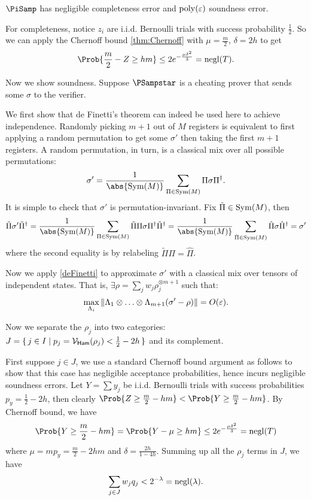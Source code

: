 \begin{thm}
    \label{QPIP1thm}
	$\PiSamp$ has negligible completeness error and $\operatorname*{\operatorname{poly}}(\varepsilon)$ soundness error.
\end{thm}
\begin{prf}
	For completeness, notice $z_i$ are i.i.d. Bernoulli trials with success probability $\frac{1}{2}$.
	So we can apply the Chernoff bound \cref{thm:Chernoff} with $\mu=\frac{m}{2}$, $\delta=2h$ to get
	$$\Prob{\frac{m}{2}-Z\geq hm}\leq2e^{-\frac{\mu\delta^2}{3}}=\negl(T).$$

	Now we show soundness.
	Suppose $\PSampstar$ is a cheating prover that sends some $\sigma$ to the verifier.

	We first show that de Finetti's theorem can indeed be used here to achieve independence.
	Randomly picking $m+1$ out of $M$ registers is equivalent to first applying a random permutation to get some $\sigma'$ then taking the first $m+1$ registers.
	A random permutation, in turn, is a classical mix over all possible permutations:
	$$\sigma'=\frac{1}{\abs{\Sym(M)}}\sum_{\Pi\in\Sym(M)}\Pi\sigma\Pi^\dagger.$$
	It is simple to check that $\sigma'$ is permutation-invariant.
	Fix $\tilde{\Pi}\in\operatorname{Sym}(M)$, then
	$$\tilde{\Pi}\sigma'\tilde{\Pi}^\dagger
	=\frac{1}{\abs{\Sym(M)}}\sum_{\Pi\in\Sym(M)}\tilde{\Pi}\Pi\sigma\Pi^\dagger\tilde{\Pi}^\dagger
	=\frac{1}{\abs{\Sym(M)}}\sum_{\hat{\Pi}\in\Sym(M)}\hat{\Pi}\sigma\hat{\Pi}^\dagger
	=\sigma'$$
	where the second equality is by relabeling $\tilde{\Pi}\Pi=\hat{\Pi}$.

	Now we apply \cref{deFinetti} to approximate $\sigma'$ with a classical mix over tensors of independent states.
	That is, $\exists\rho=\sum_j w_j\rho_j^{\otimes m+1}$ such that:
	$$\max_{\Lambda_i}\left\lVert\Lambda_1\otimes\ldots\otimes\Lambda_{m+1}(\sigma'-\rho)\right\rVert=O(\varepsilon).$$

	Now we separate the $\rho_j$ into two categories: $J=\set{j\in I|p_j=\mathcal{V}_{\mathsf{Ham}}(\rho_j)<\frac{1}{2}-2h}$ and its complement.

	First suppose $j\in J$, we use a standard Chernoff bound argument as follows to show that this case has negligible acceptance probabilities,
	hence incurs negligible soundness errors.
	Let $Y=\sum y_j$ be i.i.d. Bernoulli trials with success probabilities $p_y=\frac{1}{2}-2h$,
	then clearly $\Prob{Z\geq\frac{m}{2}-hm}<\Prob{Y\geq\frac{m}{2}-hm}$.
	By Chernoff bound, we have
	$$\Prob{Y\geq\frac{m}{2}-hm}=\Prob{Y-\mu\geq hm}\leq2e^{-\frac{\mu\delta^2}{3}}=\negl(T)$$
	where $\mu=mp_y=\frac{m}{2}-2hm$ and $\delta=\frac{2h}{1-4h}$.
	Summing up all the $\rho_j$ terms in $J$, we have
	$$\sum_{j\in J} w_j q_j<2^{-\lambda}=\operatorname{negl}(\lambda).$$


\end{prf}
